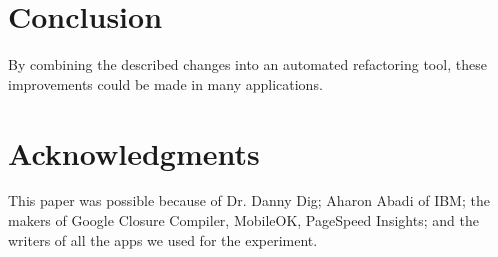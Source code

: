 \documentclass{acm_proc_article-sp}
\begin{document}
\section{Conclusion}
By combining the described changes into an automated refactoring tool, these improvements could be made in many applications.

\section{Acknowledgments}
This paper was possible because of Dr. Danny Dig; Aharon Abadi of IBM; the makers of Google Closure Compiler, MobileOK, PageSpeed Insights; and the writers of all the apps we used for the experiment.



\end{document}

